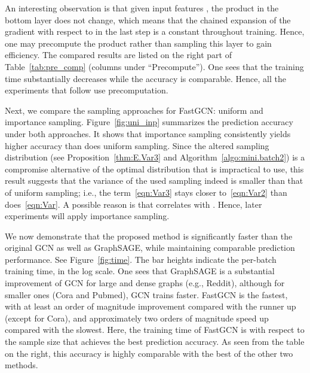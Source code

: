 \documentclass{article} \usepackage{iclr2018_conference,times}
\theoremstyle{plain}\newtheorem{theorem}{Theorem}\theoremstyle{plain}\newtheorem{proposition}[theorem]{Proposition}
\theoremstyle{plain}\newtheorem{corollary}[theorem]{Corollary}
\theoremstyle{plain}\newtheorem{lemma}[theorem]{Lemma}
\begin{document}
An interesting observation is that given input features , the product  in the bottom layer does not change, which means that the chained expansion of the gradient with respect to  in the last step is a constant throughout training. Hence, one may precompute the product rather than sampling this layer to gain efficiency. The compared results are listed on the right part of Table~\ref{tab:pre_comp} (columns under ``Precompute''). One sees that the training time substantially decreases while the accuracy is  comparable. Hence, all the experiments that follow use precomputation. 

Next, we compare the sampling approaches for FastGCN: uniform and importance sampling. Figure~\ref{fig:uni_inp} summarizes the prediction accuracy under both approaches. It shows that importance sampling consistently yields higher accuracy than does uniform sampling. Since the altered sampling distribution (see Proposition~\ref{thm:E.Var3} and Algorithm~\ref{algo:mini.batch2}) is a compromise alternative of the optimal distribution that is impractical to use, this result suggests that the variance of the used sampling indeed is smaller than that of uniform sampling; i.e., the term~\eqref{eqn:Var3} stays closer to~\eqref{eqn:Var2} than does~\eqref{eqn:Var}. A possible reason is that  correlates with . Hence, later experiments will apply importance sampling.

We now demonstrate that the proposed method is significantly faster than the original GCN as well as GraphSAGE, while maintaining comparable prediction performance. See Figure~\ref{fig:time}. The bar heights indicate the per-batch training time, in the log scale. One sees that GraphSAGE is a substantial improvement of GCN for large and dense graphs (e.g., Reddit), although for smaller ones (Cora and Pubmed), GCN trains faster. FastGCN is the fastest, with at least an order of magnitude improvement compared with the runner up (except for Cora), and approximately two orders of magnitude speed up compared with the slowest. Here, the training time of FastGCN is with respect to the sample size that achieves the best prediction accuracy. As seen from the table on the right, this accuracy is highly comparable with the best of the other two methods.
\end{document}
